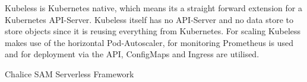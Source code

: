 \documentclass[11pt]{article}
\begin{document}
Kubeless is Kubernetes native, which means its a straight forward extension for a Kubernetes API-Server. Kubeless itself has no API-Server and no data store to store objects since it is reusing everything from Kubernetes. For scaling Kubeless makes use of the horizontal Pod-Autoscaler, for monitoring Prometheus is used and for deployment via the API, ConfigMaps and Ingress are utilised.

Chalice
SAM
Serverless Framework
\end{document}

